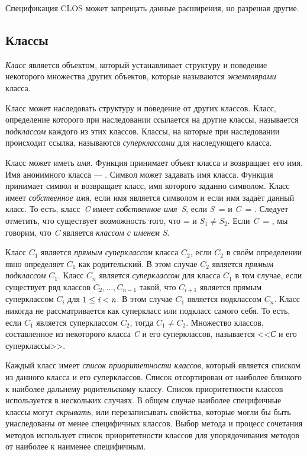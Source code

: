 Спецификация CLOS может запрещать данные расширения, но разрешая другие. 

\subsection{Классы}
\label{Classes-SECTION}

\emph{Класс} является объектом, который устанавливает структуру и поведение
некоторого множества других объектов, которые называются \emph{экземплярами}
класса.

Класс может наследовать структуру и поведение от других классов.
Класс, определение которого при наследовании ссылается на другие классы,
называется \emph{подклассом} каждого из этих классов. Классы, на которые при
наследовании происходит ссылка, называются \emph{суперклассами} для наследующего
класса.

Класс может иметь \emph{имя}. Функция  принимает объект класса и
возвращает его имя. Имя анонимного класса --- . Символ может задавать имя
класса. Функция  принимает символ и возвращает класс, имя
которого заданно символом. Класс имеет \emph{собственное имя}, если имя является
символом и если имя задаёт данный класс. То есть, класс~\emph{C} имеет
\emph{собственное имя}~\emph{S}, если \emph{S}~=  и
\emph{C}~= . Следует отметить, что существует
возможность того, что  =  и
$S_1\neq S_2$.
Если \emph{C}~= , мы говорим, что \emph{C} является
\emph{классом с именем} \emph{S}.

Класс $C_1$ является \emph{прямым суперклассом} класса $C_2$, если $C_2$ в своём
определении явно определяет $C_1$ как родительский. В этом случае $C_2$ является
\emph{прямым подклассом} $C_1$. Класс $C_n$ является \emph{суперклассом} для
класса $C_1$ в том случае, если существует ряд классов $C_{2},\ldots,C_{n-1}$
такой, что $C_{i+1}$ является прямым суперклассом $C_i$ для $1 \leq \emph{i} <
\emph{n}$. В этом случае $C_1$ является подклассом $C_n$. Класс никогда не
рассматривается как суперкласс или подкласс самого себя. То есть, если $C_1$
является суперклассом $C_2$, тогда $C_{1} \neq C_{2}$. Множество классов,
составленное из некоторого класса \emph{C} и его суперклассов, называется
<<\emph{С} и его суперклассы>>.

Каждый класс имеет \emph{список приоритетности классов}, который является списком
из данного класса и его суперклассов.
Список отсортирован от наиболее
близкого к наиболее дальнему родительскому классу.
Список приоритетности классов используется в нескольких случаях. В общем случае
наиболее специфичные классы могут \emph{скрывать}, или перезаписывать свойства,
которые могли бы быть унаследованы от менее специфичных классов. Выбор метода и
процесс сочетания методов использует список приоритетности классов для
упорядочивания методов от наиболее к наименее специфичным.

